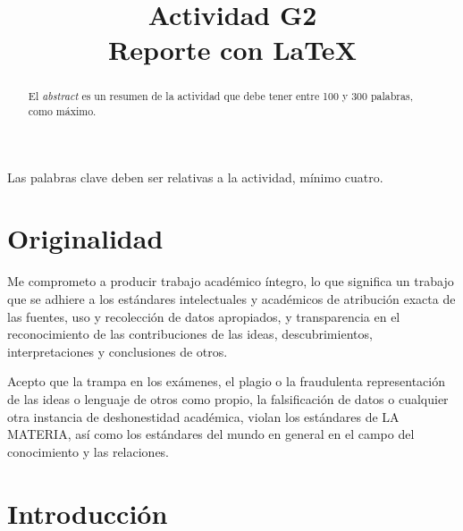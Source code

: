 \documentclass[conference]{IEEEtran}
\begin{document}
\title{Actividad G2\\Reporte con LaTeX}

\author{
}

\maketitle

\begin{abstract}
El \textit{abstract} es un resumen de la actividad que debe tener entre 100 y 300 palabras, como máximo.
\end{abstract}

\begin{IEEEkeywords}
Las palabras clave deben ser relativas a la actividad, mínimo cuatro.
\end{IEEEkeywords}

\section{Originalidad}

   Me comprometo a producir trabajo académico íntegro, lo que significa un trabajo que se adhiere a los estándares intelectuales y académicos de atribución exacta de las fuentes, uso y recolección de datos apropiados, y transparencia en el reconocimiento de las contribuciones de las ideas, descubrimientos, interpretaciones y conclusiones de otros.

   Acepto que la trampa en los exámenes, el plagio o la fraudulenta representación de las ideas o lenguaje de otros como propio, la falsificación de datos o cualquier otra instancia de deshonestidad académica, violan los estándares de LA MATERIA, así como los estándares del mundo en general en el campo del conocimiento y las relaciones.


\section{Introducción}
\end{document}
